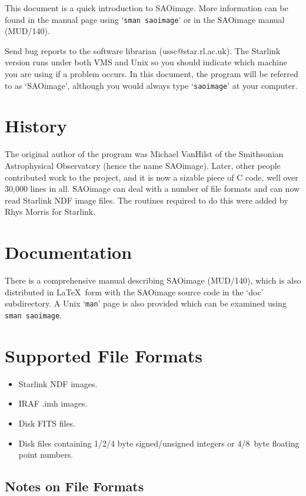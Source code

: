 This document is a quick introduction to SAOimage. More
information can be found in the manual page using `{\tt sman saoimage}'
or in the SAOimage manual (MUD/140).

Send bug reports to the software librarian (ussc@star.rl.ac.uk).
The Starlink version runs under both VMS and
Unix so you should indicate which machine you are using if a problem
occurs.  In this document, the program will be referred to as
`SAOimage', although you would always type `{\tt saoimage}' at your
computer.

\section{History}

The original author of the program was Michael VanHilst of the
Smithsonian Astrophysical Observatory (hence the name
SAOimage). Later, other people contributed work to the project, and it
is now a sizable piece of C code, well over 30,000 lines in
all. SAOimage can deal with a number of file formats and can now read
Starlink NDF image files. The routines required to do this were added
by Rhys Morris for Starlink.

\section{Documentation}

There is a comprehensive manual describing SAOimage (MUD/140),
which is also distributed in \LaTeX\ form with the SAOimage source
code in the `doc' subdirectory. A Unix `{\tt man}' page is also provided
which can be examined using {\tt sman saoimage}.

\section{Supported File Formats}

\begin{itemize}
\item{Starlink NDF images.}
\item{IRAF .imh images.}
\item{Disk FITS files.}
\item{Disk files containing 1/2/4 byte signed/unsigned integers or 4/8~byte
floating point numbers.}
\end {itemize}

\subsection{Notes on File Formats}

